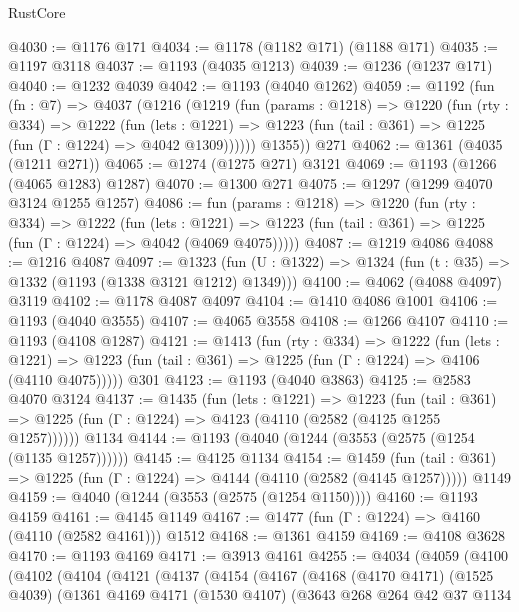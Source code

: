 \begin{lexlean}{RustCore}
\begin{coremodule}
@4030 := @1176 @171
@4034 := @1178 (@1182 @171) (@1188 @171)
@4035 := @1197 @3118
@4037 := @1193 (@4035 @1213)
@4039 := @1236 (@1237 @171)
@4040 := @1232 @4039
@4042 := @1193 (@4040 @1262)
@4059 := @1192
    (fun (fn : @7) =>
    @4037
      (@1216
        (@1219
          (fun (params : @1218) =>
          @1220
            (fun (rty : @334) =>
            @1222
              (fun (lets : @1221) =>
              @1223 (fun (tail : @361) => @1225 (fun (Γ : @1224) => @4042 @1309))))))
        @1355))
    @271
@4062 := @1361 (@4035 (@1211 @271))
@4065 := @1274 (@1275 @271) @3121
@4069 := @1193 (@1266 (@4065 @1283) @1287)
@4070 := @1300 @271
@4075 := @1297 (@1299 @4070 @3124 @1255 @1257)
@4086 := fun (params : @1218) =>
  @1220
    (fun (rty : @334) =>
    @1222
      (fun (lets : @1221) =>
      @1223 (fun (tail : @361) => @1225 (fun (Γ : @1224) => @4042 (@4069 @4075)))))
@4087 := @1219 @4086
@4088 := @1216 @4087
@4097 := @1323 (fun (U : @1322) => @1324 (fun (t : @35) => @1332 (@1193 (@1338 @3121 @1212) @1349)))
@4100 := @4062 (@4088 @4097) @3119
@4102 := @1178 @4087 @4097
@4104 := @1410 @4086 @1001
@4106 := @1193 (@4040 @3555)
@4107 := @4065 @3558
@4108 := @1266 @4107
@4110 := @1193 (@4108 @1287)
@4121 := @1413
    (fun (rty : @334) =>
    @1222
      (fun (lets : @1221) =>
      @1223 (fun (tail : @361) => @1225 (fun (Γ : @1224) => @4106 (@4110 @4075)))))
    @301
@4123 := @1193 (@4040 @3863)
@4125 := @2583 @4070 @3124
@4137 := @1435
    (fun (lets : @1221) =>
    @1223
      (fun (tail : @361) => @1225 (fun (Γ : @1224) => @4123 (@4110 (@2582 (@4125 @1255 @1257))))))
    @1134
@4144 := @1193 (@4040 (@1244 (@3553 (@2575 (@1254 (@1135 @1257))))))
@4145 := @4125 @1134
@4154 := @1459
    (fun (tail : @361) => @1225 (fun (Γ : @1224) => @4144 (@4110 (@2582 (@4145 @1257)))))
    @1149
@4159 := @4040 (@1244 (@3553 (@2575 (@1254 @1150))))
@4160 := @1193 @4159
@4161 := @4145 @1149
@4167 := @1477 (fun (Γ : @1224) => @4160 (@4110 (@2582 @4161))) @1512
@4168 := @1361 @4159
@4169 := @4108 @3628
@4170 := @1193 @4169
@4171 := @3913 @4161
@4255 := @4034
    (@4059
      (@4100
        (@4102
          (@4104
            (@4121
              (@4137
                (@4154
                  (@4167
                    (@4168
                      (@4170 @4171)
                      (@1525 @4039)
                      (@1361
                        @4169
                        @4171
                        (@1530 @4107)
                        (@3643
                          @268
                          @264
                          @42
                          @37
                          @1134

\end{coremodule}
\end{lexlean}
